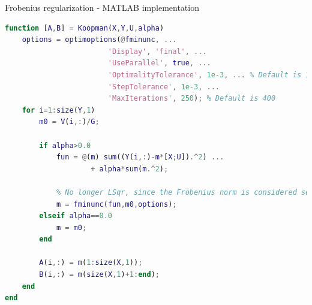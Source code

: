 \documentclass{beamer}
\begin{document}
\begin{frame}[fragile]{Frobenius regularization - MATLAB implementation}
    \begin{lstlisting}[language=Matlab,basicstyle=\tiny]
function [A,B] = Koopman(X,Y,U,alpha)
    options = optimoptions(@fminunc, ...
                        'Display', 'final', ...
                        'UseParallel', true, ...
                        'OptimalityTolerance', 1e-3, ... % Default is 1e-6
                        'StepTolerance', 1e-3, ...
                        'MaxIterations', 250); % Default is 400
    for i=1:size(Y,1)
        m0 = V(i,:)/G;

        if alpha>0.0
            fun = @(m) sum((Y(i,:)-m*[X;U]).^2) ...
                    + alpha*sum(m.^2);

            % No longer LSqr, since the Frobenius norm is considered separately
            m = fminunc(fun,m0,options);
        elseif alpha==0.0
            m = m0;
        end

        A(i,:) = m(1:size(X,1));
        B(i,:) = m(size(X,1)+1:end);
    end
end
    \end{lstlisting}
\end{frame}
\end{document}

